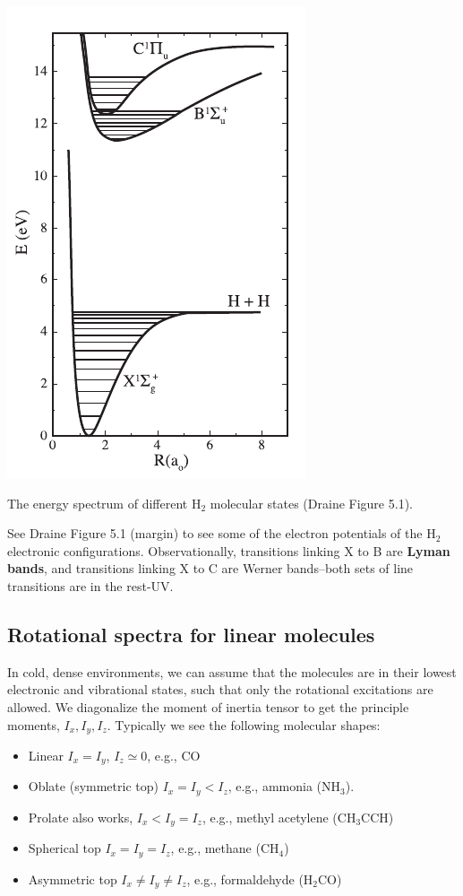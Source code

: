 \documentclass{tufte-handout}
\renewcommand{\textbf}[1]{{\bf \textcolor{dark-gray}{#1}}}
\begin{document}
\begin{marginfigure}
\includegraphics[]{ism_figures/Draine-5_1}
\caption{The energy spectrum of different H$_2$ molecular states (Draine Figure 5.1).}
\end{marginfigure}


See Draine Figure 5.1 (margin) to see some of the electron potentials of the H$_2$ electronic configurations.
Observationally, transitions linking X to B are \textbf{Lyman bands}, and transitions linking X to C are Werner bands--both sets of line transitions are in the rest-UV.


\subsection{Rotational spectra for linear molecules}
In cold, dense environments, we can assume that the molecules are in their lowest electronic and vibrational states, such that only the rotational excitations are allowed.
We diagonalize the moment of inertia tensor to get the principle moments, $I_x, I_y, I_z$.
Typically we see the following molecular shapes:
\begin{itemize}
\item Linear $I_x = I_y$, $I_z \simeq 0$, e.g., CO
\item Oblate (symmetric top) $I_x = I_y < I_z$, e.g., ammonia (NH$_3$).
\item[] Prolate also works, $I_x < I_y = I_z$, e.g., methyl acetylene (CH$_3$CCH)
\item Spherical top $I_x = I_y = I_z$, e.g., methane (CH$_4$)
\item Asymmetric top $I_x \neq I_y \neq I_z$, e.g., formaldehyde (H$_2$CO)
\end{itemize}
\end{document}
